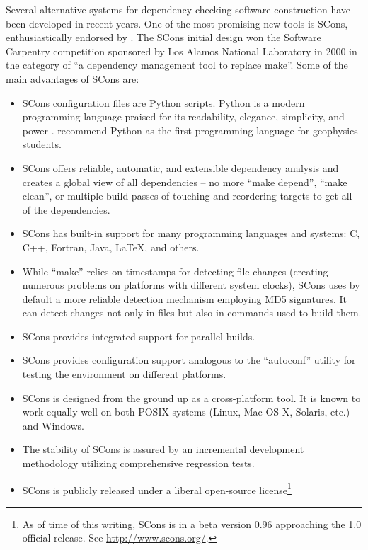 Several alternative systems for dependency-checking software
construction have been developed in recent years. One of the most
promising new tools is SCons, enthusiastically endorsed by
\cite{dubois}. The SCons initial design won the Software Carpentry
competition sponsored by Los Alamos National Laboratory in 2000 in the
category of ``a dependency management tool to replace make''.  Some of
the main advantages of SCons are:
\begin{itemize}
\item SCons configuration files are Python scripts. Python is a modern
  programming language praised for its readability, elegance,
  simplicity, and power \cite[]{python1,python2}.
  \cite{TLE21-03-02600267} recommend Python as the first programming
  language for geophysics students.
\item SCons offers reliable, automatic, and extensible dependency
  analysis and creates a global view of all dependencies -- no more
  ``make depend'', ``make clean'', or multiple build passes of
  touching and reordering targets to get all of the dependencies.
\item SCons has built-in support for many programming languages and
  systems: C, C++, Fortran, Java, LaTeX, and others.
\item While ``make'' relies on timestamps for detecting file changes
  (creating numerous problems on platforms with different system
  clocks), SCons uses by default a more reliable detection
  mechanism employing MD5 signatures. It can detect changes not only
  in files but also in commands used to build them.
\item SCons provides integrated support for parallel builds.
\item SCons provides configuration support analogous to the ``autoconf''
  utility for testing the environment on different platforms.
\item SCons is designed from the ground up as a cross-platform tool.
  It is known to work equally well on both POSIX systems (Linux, Mac
  OS X, Solaris, etc.) and Windows.
\item The stability of SCons is assured by an incremental development
  methodology utilizing comprehensive regression tests.
\item SCons is publicly released under a liberal open-source license\footnote{As of time of this writing, SCons is in a beta version 0.96 approaching the 1.0 official release. See \url{http://www.scons.org/}.}
\end{itemize}

